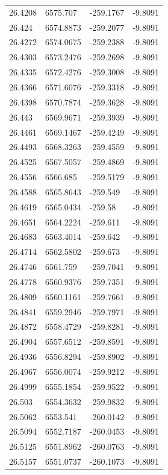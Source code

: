 \begin{table}[H]
\begin{tabular}{llll}
26.4208 & 6575.707 & -259.1767 & -9.8091 \\
26.424 & 6574.8873 & -259.2077 & -9.8091 \\
26.4272 & 6574.0675 & -259.2388 & -9.8091 \\
26.4303 & 6573.2476 & -259.2698 & -9.8091 \\
26.4335 & 6572.4276 & -259.3008 & -9.8091 \\
26.4366 & 6571.6076 & -259.3318 & -9.8091 \\
26.4398 & 6570.7874 & -259.3628 & -9.8091 \\
26.443 & 6569.9671 & -259.3939 & -9.8091 \\
26.4461 & 6569.1467 & -259.4249 & -9.8091 \\
26.4493 & 6568.3263 & -259.4559 & -9.8091 \\
26.4525 & 6567.5057 & -259.4869 & -9.8091 \\
26.4556 & 6566.685 & -259.5179 & -9.8091 \\
26.4588 & 6565.8643 & -259.549 & -9.8091 \\
26.4619 & 6565.0434 & -259.58 & -9.8091 \\
26.4651 & 6564.2224 & -259.611 & -9.8091 \\
26.4683 & 6563.4014 & -259.642 & -9.8091 \\
26.4714 & 6562.5802 & -259.673 & -9.8091 \\
26.4746 & 6561.759 & -259.7041 & -9.8091 \\
26.4778 & 6560.9376 & -259.7351 & -9.8091 \\
26.4809 & 6560.1161 & -259.7661 & -9.8091 \\
26.4841 & 6559.2946 & -259.7971 & -9.8091 \\
26.4872 & 6558.4729 & -259.8281 & -9.8091 \\
26.4904 & 6557.6512 & -259.8591 & -9.8091 \\
26.4936 & 6556.8294 & -259.8902 & -9.8091 \\
26.4967 & 6556.0074 & -259.9212 & -9.8091 \\
26.4999 & 6555.1854 & -259.9522 & -9.8091 \\
26.503 & 6554.3632 & -259.9832 & -9.8091 \\
26.5062 & 6553.541 & -260.0142 & -9.8091 \\
26.5094 & 6552.7187 & -260.0453 & -9.8091 \\
26.5125 & 6551.8962 & -260.0763 & -9.8091 \\
26.5157 & 6551.0737 & -260.1073 & -9.8091 \\

\end{tabular}
\end{table}
